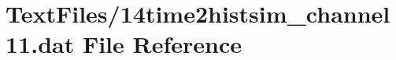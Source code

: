 \hypertarget{14time2histsim__channel11_8dat}{}\section{Text\+Files/14time2histsim\+\_\+channel11.dat File Reference}
\label{14time2histsim__channel11_8dat}
